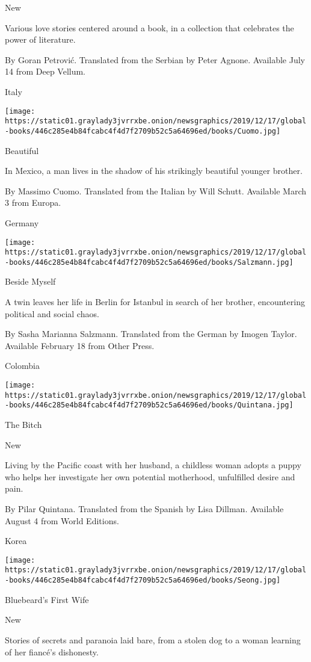 New

Various love stories centered around a book, in a collection that
celebrates the power of literature.

 By Goran Petrović. Translated from the Serbian by Peter Agnone.
Available July 14 from Deep Vellum.

Italy

\texttt{[image: https://static01.graylady3jvrrxbe.onion/newsgraphics/2019/12/17/global-books/446c285e4b84fcabc4f4d7f2709b52c5a64696ed/books/Cuomo.jpg]}

Beautiful

In Mexico, a man lives in the shadow of his strikingly beautiful younger
brother.

 By Massimo Cuomo. Translated from the Italian by Will Schutt. Available
March 3 from Europa.

Germany

\texttt{[image: https://static01.graylady3jvrrxbe.onion/newsgraphics/2019/12/17/global-books/446c285e4b84fcabc4f4d7f2709b52c5a64696ed/books/Salzmann.jpg]}

Beside Myself

A twin leaves her life in Berlin for Istanbul in search of her brother,
encountering political and social chaos.

 By Sasha Marianna Salzmann. Translated from the German by Imogen
Taylor. Available February 18 from Other Press.

Colombia

\texttt{[image: https://static01.graylady3jvrrxbe.onion/newsgraphics/2019/12/17/global-books/446c285e4b84fcabc4f4d7f2709b52c5a64696ed/books/Quintana.jpg]}

The Bitch

New

Living by the Pacific coast with her husband, a childless woman adopts a
puppy who helps her investigate her own potential motherhood,
unfulfilled desire and pain.

 By Pilar Quintana. Translated from the Spanish by Lisa Dillman.
Available August 4 from World Editions.

Korea

\texttt{[image: https://static01.graylady3jvrrxbe.onion/newsgraphics/2019/12/17/global-books/446c285e4b84fcabc4f4d7f2709b52c5a64696ed/books/Seong.jpg]}

Bluebeard's First Wife

New

Stories of secrets and paranoia laid bare, from a stolen dog to a woman
learning of her fiancé's dishonesty.


